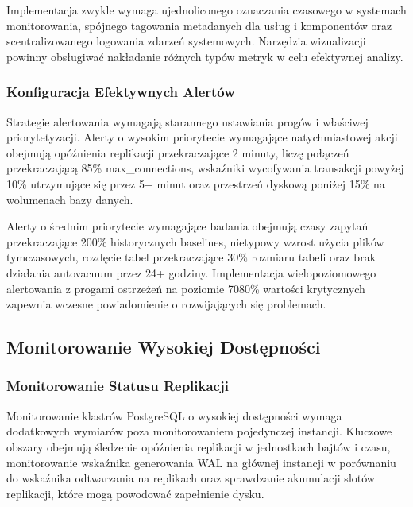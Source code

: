 \documentclass[letterpaper,10pt,polish]{sphinxmanual}
\begin{document}
\sphinxAtStartPar
Implementacja zwykle wymaga ujednoliconego oznaczania czasowego w systemach monitorowania, spójnego tagowania metadanych dla usług i komponentów oraz scentralizowanego logowania zdarzeń systemowych. Narzędzia wizualizacji powinny obsługiwać nakładanie różnych typów metryk w celu efektywnej analizy.


\subsubsection{Konfiguracja Efektywnych Alertów}
\label{\detokenize{rozdzial2/repo-wspolne/index:konfiguracja-efektywnych-alertow}}
\sphinxAtStartPar
Strategie alertowania wymagają starannego ustawiania progów i właściwej priorytetyzacji. Alerty o wysokim priorytecie wymagające natychmiastowej akcji obejmują opóźnienia replikacji przekraczające 2 minuty, liczę połączeń przekraczającą 85\% max\_connections, wskaźniki wycofywania transakcji powyżej 10\% utrzymujące się przez 5+ minut oraz przestrzeń dyskową poniżej 15\% na wolumenach bazy danych.

\sphinxAtStartPar
Alerty o średnim priorytecie wymagające badania obejmują czasy zapytań przekraczające 200\% historycznych baselines, nietypowy wzrost użycia plików tymczasowych, rozdęcie tabel przekraczające 30\% rozmiaru tabeli oraz brak działania autovacuum przez 24+ godziny. Implementacja wielopoziomowego alertowania z progami ostrzeżeń na poziomie 70\sphinxhyphen{}80\% wartości krytycznych zapewnia wczesne powiadomienie o rozwijających się problemach.


\subsection{Monitorowanie Wysokiej Dostępności}
\label{\detokenize{rozdzial2/repo-wspolne/index:monitorowanie-wysokiej-dostepnosci}}

\subsubsection{Monitorowanie Statusu Replikacji}
\label{\detokenize{rozdzial2/repo-wspolne/index:monitorowanie-statusu-replikacji}}
\sphinxAtStartPar
Monitorowanie klastrów PostgreSQL o wysokiej dostępności wymaga dodatkowych wymiarów poza monitorowaniem pojedynczej instancji. Kluczowe obszary obejmują śledzenie opóźnienia replikacji w jednostkach bajtów i czasu, monitorowanie wskaźnika generowania WAL na głównej instancji w porównaniu do wskaźnika odtwarzania na replikach oraz sprawdzanie akumulacji slotów replikacji, które mogą powodować zapełnienie dysku.
\end{document}

